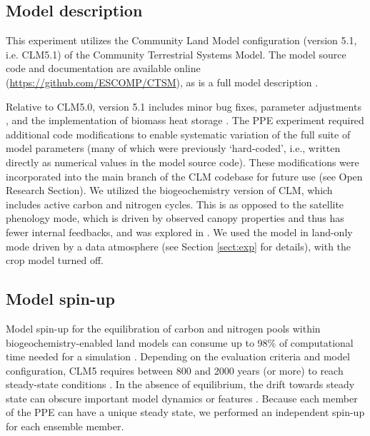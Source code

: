 \documentclass[draft]{agujournal2019}
\begin{document}
\subsection{Model description}
\label{sect:md}
This experiment utilizes the Community Land Model configuration (version 5.1, i.e. CLM5.1) of the Community Terrestrial Systems Model. The model source code and documentation are available online (\url{https://github.com/ESCOMP/CTSM}), as is a full model description \cite{lawrence2019}.

Relative to CLM5.0, version 5.1 includes minor bug fixes, parameter adjustments \cite{birch2021}, and the implementation of biomass heat storage \cite{swenson2019}. The PPE experiment required additional code modifications to enable systematic variation of the full suite of model parameters (many of which were previously `hard-coded', i.e., written directly as numerical values in the model source code). These modifications were incorporated into the main branch of the CLM codebase for future use (see Open Research Section). We utilized the biogeochemistry version of CLM, which includes active carbon and nitrogen cycles. This is as opposed to the satellite phenology mode, which is driven by observed canopy properties and thus has fewer internal feedbacks, and was explored in . We used the model in land-only mode driven by a data atmosphere (see Section \ref{sect:exp} for details), with the crop model turned off.

\subsection{Model spin-up}
\label{sect:mcn}
Model spin-up for the equilibration of carbon and nitrogen pools within biogeochemistry-enabled land models can consume up to 98\% of computational time needed for a simulation \cite{sun2023}. Depending on the evaluation criteria and model configuration, CLM5 requires between 800 and 2000 years (or more) to reach steady-state conditions \cite{lawrence2019}. In the absence of equilibrium, the drift towards steady state can obscure important model dynamics or features \cite{seferian2016}. Because each member of the PPE can have a unique steady state, we performed an independent spin-up for each ensemble member.
\end{document}
